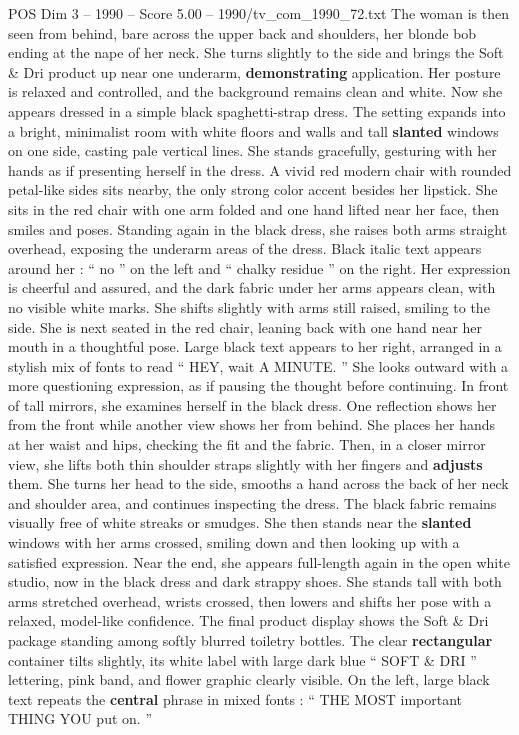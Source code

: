 \begin{textsample}{POS Dim 3 – 1990 – Score 5.00 – 1990/tv\_com\_1990\_72.txt}
The woman is then seen from behind, bare across the upper back and shoulders, her blonde bob ending at the nape of her neck.
She turns slightly to the side and brings the Soft \& Dri product up near one underarm, \textbf{demonstrating} application.
Her posture is relaxed and controlled, and the background remains clean and white.
Now she appears dressed in a simple black spaghetti-strap dress.
The setting expands into a bright, minimalist room with white floors and walls and tall \textbf{slanted} windows on one side, casting pale vertical lines.
She stands gracefully, gesturing with her hands as if presenting herself in the dress.
A vivid red modern chair with rounded petal-like sides sits nearby, the only strong color accent besides her lipstick.
She sits in the red chair with one arm folded and one hand lifted near her face, then smiles and poses.
Standing again in the black dress, she raises both arms straight overhead, exposing the underarm areas of the dress.
Black italic text appears around her : “ no ” on the left and “ chalky residue ” on the right.
Her expression is cheerful and assured, and the dark fabric under her arms appears clean, with no visible white marks.
She shifts slightly with arms still raised, smiling to the side.
She is next seated in the red chair, leaning back with one hand near her mouth in a thoughtful pose.
Large black text appears to her right, arranged in a stylish mix of fonts to read “ HEY, wait A MINUTE. ” She looks outward with a more questioning expression, as if pausing the thought before continuing.
In front of tall mirrors, she examines herself in the black dress.
One reflection shows her from the front while another view shows her from behind.
She places her hands at her waist and hips, checking the fit and the fabric.
Then, in a closer mirror view, she lifts both thin shoulder straps slightly with her fingers and \textbf{adjusts} them.
She turns her head to the side, smooths a hand across the back of her neck and shoulder area, and continues inspecting the dress.
The black fabric remains visually free of white streaks or smudges.
She then stands near the \textbf{slanted} windows with her arms crossed, smiling down and then looking up with a satisfied expression.
Near the end, she appears full-length again in the open white studio, now in the black dress and dark strappy shoes.
She stands tall with both arms stretched overhead, wrists crossed, then lowers and shifts her pose with a relaxed, model-like confidence.
The final product display shows the Soft \& Dri package standing among softly blurred toiletry bottles.
The clear \textbf{rectangular} container tilts slightly, its white label with large dark blue “ SOFT \& DRI ” lettering, pink band, and flower graphic clearly visible.
On the left, large black text repeats the \textbf{central} phrase in mixed fonts : “ THE MOST important THING YOU put on. ”

\end{textsample}
